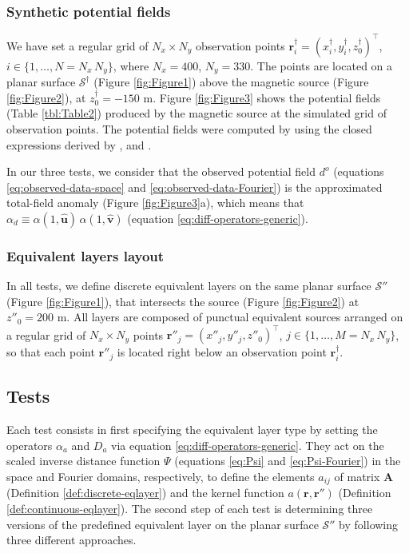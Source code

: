 \documentclass[manuscript,noblind]{geophysics}
\begin{document}
	\subsubsection{Synthetic potential fields}
	
	We have set a regular grid of $N_{x} \times N_{y}$ observation points 
	$\mathbf{r}^{\dagger}_{i} = (x^{\dagger}_{i}, y^{\dagger}_{i}, z^{\dagger}_{0})^{\top}$, $i \in \{1, \dots, N = N_{x} \, N_{y}\}$,
	where $N_{x} = 400$, $N_{y} = 330$. 
	The points are located on a planar surface $\mathcal{S}^{\dagger}$ (Figure \ref{fig:Figure1}) above the magnetic source
	(Figure \ref{fig:Figure2}), at $z^{\dagger}_{0} = -150$ m.
	Figure \ref{fig:Figure3} shows the potential fields (Table \ref{tbl:Table2}) produced by the magnetic source at 
	the simulated grid of observation points.
	The potential fields were computed by using the closed expressions derived by \cite{Nagyetal2000}, \cite{Nagyetal2002} 
	and \cite{Fukushima2020}.
	
	In our three tests, we consider that the observed potential field $d^{o}$ (equations \ref{eq:observed-data-space} and \ref{eq:observed-data-Fourier}) 
	is the approximated total-field anomaly (Figure \ref{fig:Figure3}a), which means that 
	$\alpha_{d} \equiv \alpha(1, \hat{\mathbf{u}}) \, \alpha(1, \hat{\mathbf{v}})$ (equation \ref{eq:diff-operators-generic}).
	
	\subsubsection{Equivalent layers layout}
	
	In all tests, we define discrete equivalent layers on the same planar surface $\mathcal{S}''$ (Figure \ref{fig:Figure1}), 
	that intersects the source (Figure \ref{fig:Figure2}) at $z''_{0} = 200$ m.
	All layers are composed of punctual equivalent sources arranged on a regular grid of $N_{x} \times N_{y}$ points 
	$\mathbf{r}''_{j} = (x''_{j}, y''_{j}, z''_{0})^{\top}$, $j \in \{1, \dots, M = N_{x} \, N_{y}\}$,
	so that each point $\mathbf{r}''_{j}$ is located right below an observation point $\mathbf{r}^{\dagger}_{i}$.
	
	\subsection{Tests}
	
	Each test consists in first specifying the equivalent layer type by setting the operators $\alpha_{a}$ and $D_{a}$ 
	via equation \ref{eq:diff-operators-generic}.
	They act on the scaled inverse distance function $\Psi$ 
	(equations \ref{eq:Psi} and \ref{eq:Psi-Fourier}) in the space and Fourier domains,
	respectively, to define the elements $a_{ij}$ of matrix $\mathbf{A}$ (Definition \ref{def:discrete-eqlayer}) and 
	the kernel function $a(\mathbf{r}, \mathbf{r}'')$ (Definition \ref{def:continuous-eqlayer}).
	The second step of each test is determining three versions of the predefined equivalent layer 
	on the planar surface $\mathcal{S}''$ by following three different approaches.
	
\end{document}
